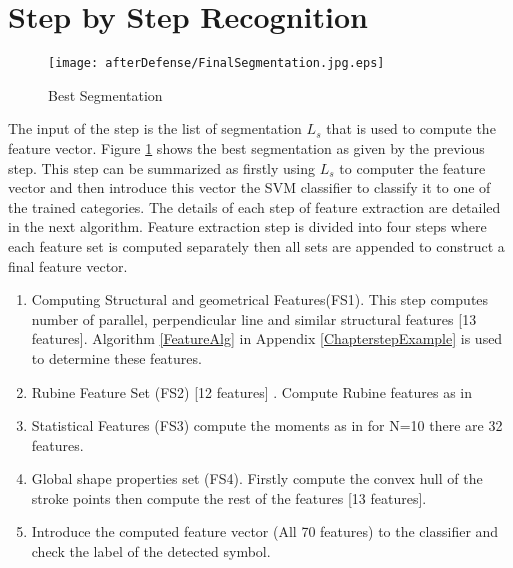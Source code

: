 \section{Step by Step Recognition}
\label{apsec:steprec}

\begin{figure}
	\centering
		\texttt{[image: afterDefense/FinalSegmentation.jpg.eps]}
	\caption{Best Segmentation }
	\label{fig:segmentatiofinal.jpg}
\end{figure}


	The input of the step is the list of segmentation $L_s$ that is used to compute the feature vector. Figure \ref{fig:segmentatiofinal.jpg} shows the best segmentation as given by the previous step. This step can be summarized as firstly using $L_s$ to computer the feature vector and then introduce this vector the SVM classifier to classify it to one of the trained categories. The details of each step of feature extraction are detailed in the next algorithm. Feature extraction step is divided into four steps where each feature set is computed separately then all sets are appended to construct a final feature vector. 
	\begin{enumerate}
	\item Computing Structural and geometrical Features(FS1). This step computes number of parallel, perpendicular line and similar structural features [13 features]. Algorithm \ref{FeatureAlg} in Appendix \ref{ChapterstepExample}  is used to determine these features.
 	\item Rubine Feature Set (FS2) [12 features] .  Compute Rubine features as in \cite{gestureexample12} 
	\item Statistical Features (FS3) compute the moments as in \cite{zernike61} for N=10 there are 32 features.
	\item Global shape properties set (FS4). Firstly compute the convex hull of the stroke points then compute the rest of the features [13 features]. 
	\item Introduce the computed feature vector (All 70 features) to the classifier and check the label of the detected symbol. 
\end{enumerate}

